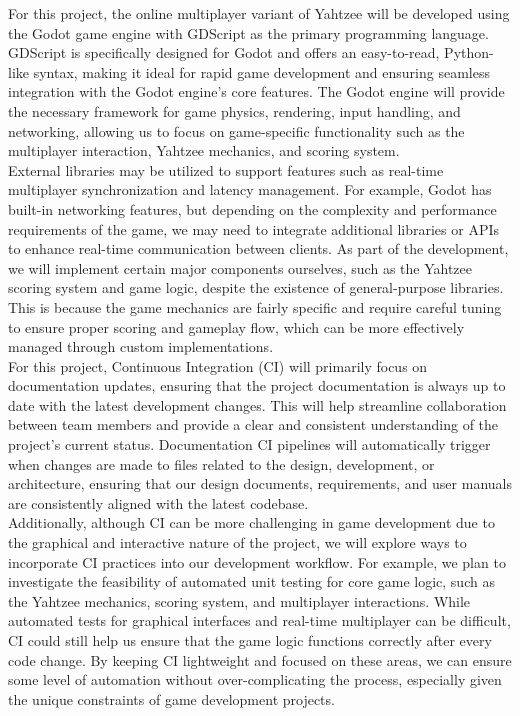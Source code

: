 \documentclass{article}
\begin{document}
For this project, the online multiplayer variant of Yahtzee will be developed using the Godot game engine with GDScript as the primary programming language. GDScript is specifically designed for Godot and offers an easy-to-read, Python-like syntax, making it ideal for rapid game development and ensuring seamless integration with the Godot engine's core features. The Godot engine will provide the necessary framework for game physics, rendering, input handling, and networking, allowing us to focus on game-specific functionality such as the multiplayer interaction, Yahtzee mechanics, and scoring system. \\

External libraries may be utilized to support features such as real-time multiplayer synchronization and latency management. For example, Godot has built-in networking features, but depending on the complexity and performance requirements of the game, we may need to integrate additional libraries or APIs to enhance real-time communication between clients. As part of the development, we will implement certain major components ourselves, such as the Yahtzee scoring system and game logic, despite the existence of general-purpose libraries. This is because the game mechanics are fairly specific and require careful tuning to ensure proper scoring and gameplay flow, which can be more effectively managed through custom implementations. \\

For this project, Continuous Integration (CI) will primarily focus on documentation updates, ensuring that the project documentation is always up to date with the latest development changes. This will help streamline collaboration between team members and provide a clear and consistent understanding of the project’s current status. Documentation CI pipelines will automatically trigger when changes are made to files related to the design, development, or architecture, ensuring that our design documents, requirements, and user manuals are consistently aligned with the latest codebase. \\

Additionally, although CI can be more challenging in game development due to the graphical and interactive nature of the project, we will explore ways to incorporate CI practices into our development workflow. For example, we plan to investigate the feasibility of automated unit testing for core game logic, such as the Yahtzee mechanics, scoring system, and multiplayer interactions. While automated tests for graphical interfaces and real-time multiplayer can be difficult, CI could still help us ensure that the game logic functions correctly after every code change. By keeping CI lightweight and focused on these areas, we can ensure some level of automation without over-complicating the process, especially given the unique constraints of game development projects. \\
\end{document}

